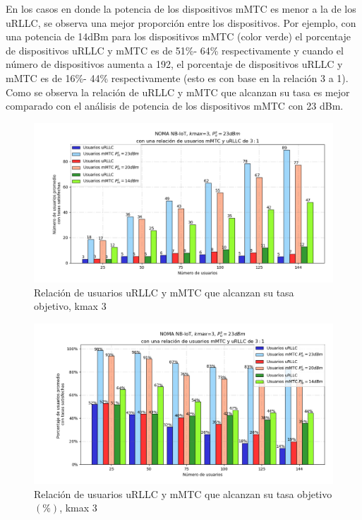 En los casos en donde la potencia de los dispositivos mMTC es menor a la de los uRLLC, se observa una mejor proporción entre los dispositivos. Por ejemplo, con una potencia de 14dBm para los dispositivos mMTC (color verde) el porcentaje de dispositivos uRLLC y mMTC es de 51\%- 64\% respectivamente y cuando el número de dispositivos aumenta a 192, el porcentaje de dispositivos uRLLC y mMTC es de 16\%- 44\% respectivamente (esto es con base en la relación 3 a 1). Como se observa la relación de uRLLC y mMTC que alcanzan su tasa es mejor comparado con el análisis de potencia de los dispositivos mMTC con 23 dBm. \newline

\break

\begin{figure}[th]
    \centering
    \includegraphics[scale=.65]{Figures/ResultadosNOMA/Kmax3_DiferentesPM.png}
    \decoRule
    \caption[Relación de usuarios uRLLC y mMTC que alcanzan su tasa objetivo, kmax 3]{Relación de usuarios uRLLC y mMTC que alcanzan su tasa objetivo, kmax 3}
    \label{fig:Kmax3_DiferentesPM}
\end{figure}

\begin{figure}[th]
    \centering
    \includegraphics[scale=.65]{Figures/ResultadosNOMA/Kmax3_DiferentesPM_Porcentual.png}
    \decoRule
    \caption[Relación de usuarios uRLLC y mMTC que alcanzan su tasa objetivo $(\%)$, kmax 3]{Relación de usuarios uRLLC y mMTC que alcanzan su tasa objetivo$(\%)$, kmax 3}
    \label{fig:Kmax3_DiferentesPM_Porcentual}
\end{figure}

